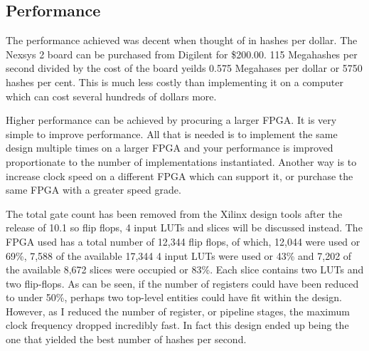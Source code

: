 	\subsection{Performance}
		The performance achieved was decent when thought of in hashes per dollar.  The Nexsys 2 board can be purchased from Digilent for \$200.00.  115 Megahashes per second divided by the cost of the board yeilds 0.575 Megahases per dollar or 5750 hashes per cent.  This is much less costly than implementing it on a computer which can cost several hundreds of dollars more.  
		
		Higher performance can be achieved by procuring a larger FPGA.  It is very simple to improve performance.  All that is needed is to implement the same design multiple times on a larger FPGA and your performance is improved proportionate to the number of implementations instantiated.  Another way is to increase clock speed on a different FPGA which can support it, or purchase the same FPGA with a greater speed grade.
		
		The total gate count has been removed from the Xilinx design tools after the release of 10.1 so flip flops, 4 input LUTs and slices will be discussed instead.  The FPGA used has a total number of 12,344 flip flops, of which, 12,044 were used or 69\%,  7,588 of the available 17,344 4 input LUTs were used or 43\% and 7,202 of the available 8,672 slices were occupied or 83\%\cite{fpga}.  Each slice contains two LUTs and two flip-flops.  As can be seen, if the number of registers could have been reduced to under 50\%, perhaps two top-level entities could have fit within the design.  However, as I reduced the number of register, or pipeline stages, the maximum clock frequency dropped incredibly fast.  In fact this design ended up being the one that yielded the best number of hashes per second.
	

